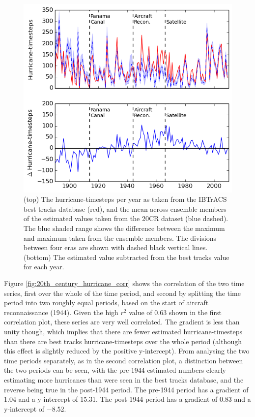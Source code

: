 \documentclass[pdftex,12pt,a4paper]{report}
\begin{document}
\begin{figure}[ht!]
    \centering
    \includegraphics[width=\textwidth]{figures/20th_century_hurricane_timesteps}
    \caption{(top) The hurricane-timesteps per year as taken from the IBTrACS best tracks database
        (red), and the mean across ensemble members of the estimated values taken from the 20CR
        dataset (blue dashed). The blue shaded range shows the difference between the maximum and maximum
        taken from the ensemble members. The divisions between four eras are shown with dashed black
        vertical lines. (bottom) The estimated value subtracted from the best tracks value for each
        year. 
    }
    \label{fig:20th_century_hurricane_timesteps}
\end{figure}

\newpage
Figure \ref{fig:20th_century_hurricane_corr} shows the correlation of the two time series, first
over the whole of the time period, and second by splitting the time period into two roughly equal
periods, based on the start of aircraft reconnaissance (1944). Given the high $r^2$ value of
\SI{0.63}{} shown in the first correlation plot, these series are very well correlated. The gradient
is less than unity though, which implies that there are fewer estimated hurricane-timesteps than
there are best tracks hurricane-timesteps over the whole period (although this effect is slightly
reduced by the positive y-intercept). From analysing the two time periods separately, as in the
second correlation plot, a distinction between the two periods can be seen, with the pre-1944
estimated numbers clearly estimating more hurricanes than were seen in the best tracks database, and
the reverse being true in the post-1944 period. The pre-1944 period has a gradient of \SI{1.04}{}
and a y-intercept of \SI{15.31}{}. The post-1944 period has a gradient of \SI{0.83}{} and a
y-intercept of \SI{-8.52}{}.
\end{document}
